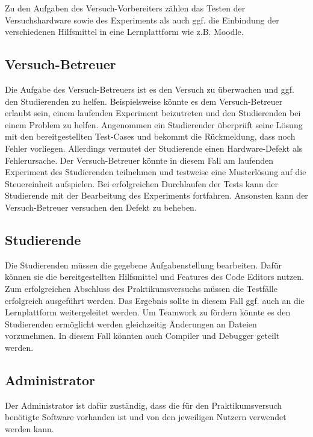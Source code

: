Zu den Aufgaben des Versuch-Vorbereiters zählen das Testen der Versuchshardware sowie des Experiments als auch ggf. die Einbindung der verschiedenen Hilfsmittel in eine Lernplattform wie z.B. Moodle.

\subsection{Versuch-Betreuer}

Die Aufgabe des Versuch-Betreuers ist es den Versuch zu überwachen und ggf. den Studierenden zu helfen. Beispielsweise könnte es dem Versuch-Betreuer erlaubt sein, einem laufenden Experiment beizutreten und den Studierenden bei einem Problem zu helfen. Angenommen ein Studierender überprüft seine Lösung mit den bereitgestellten Test-Cases und bekommt die Rückmeldung, dass noch Fehler vorliegen. Allerdings vermutet der Studierende einen Hardware-Defekt als Fehlerursache. Der Versuch-Betreuer könnte in diesem Fall am laufenden Experiment des Studierenden teilnehmen und testweise eine Musterlösung auf die Steuereinheit aufspielen. Bei erfolgreichen Durchlaufen der Tests kann der Studierende mit der Bearbeitung des Experiments fortfahren. Ansonsten kann der Versuch-Betreuer versuchen den Defekt zu beheben.

\subsection{Studierende}

Die Studierenden müssen die gegebene Aufgabenstellung bearbeiten. Dafür können sie die bereitgestellten Hilfsmittel und Features des Code Editors nutzen. Zum erfolgreichen Abschluss des Praktikumsversuchs müssen die Testfälle erfolgreich ausgeführt werden. Das Ergebnis sollte in diesem Fall ggf. auch an die Lernplattform weitergeleitet werden. Um Teamwork zu fördern könnte es den Studierenden ermöglicht werden gleichzeitig Änderungen an Dateien vorzunehmen. In diesem Fall könnten auch Compiler und Debugger geteilt werden.

\subsection{Administrator}

Der Administrator ist dafür zuständig, dass die für den Praktikumsversuch benötigte Software vorhanden ist und von den jeweiligen Nutzern verwendet werden kann.